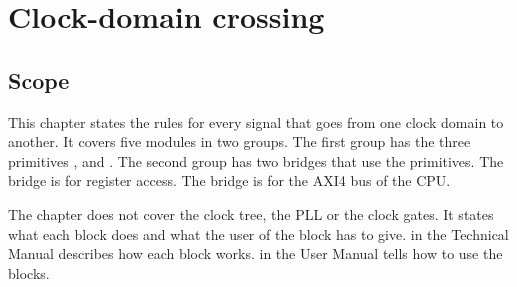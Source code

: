 \chapter{Clock-domain crossing}\label{ds:ch:mod-cdc-primitives}

\section{Scope}\label{ds:ch:mod-cdc-primitives:scope}
This chapter states the rules for every signal that goes from one clock domain to another. It covers five modules in two groups. The first group has the three primitives ,  and . The second group has two bridges that use the primitives. The bridge  is for register access. The bridge  is for the AXI4 bus of the CPU.

The chapter does not cover the clock tree, the PLL or the clock gates. It states what each block does and what the user of the block has to give.  in the Technical Manual describes how each block works.  in the User Manual tells how to use the blocks.

